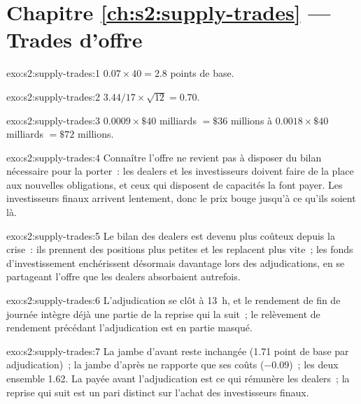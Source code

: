 \section*{Chapitre \ref{ch:s2:supply-trades} --- Trades d'offre}

\begin{solution}{exo:s2:supply-trades:1}
$0.07 \times 40 = 2.8$ points de base.
\end{solution}

\begin{solution}{exo:s2:supply-trades:2}
$3.44/17 \times \sqrt{12} = 0.70$.
\end{solution}

\begin{solution}{exo:s2:supply-trades:3}
$0.0009 \times \$40$ milliards $= \$36$ millions à $0.0018 \times \$40$ milliards $= \$72$ millions.
\end{solution}

\begin{solution}{exo:s2:supply-trades:4}
Connaître l'offre ne revient pas à disposer du bilan nécessaire pour la porter~: les dealers et les investisseurs doivent faire de la place aux nouvelles obligations, et ceux qui
disposent de capacités la font payer. Les investisseurs finaux arrivent lentement, donc le prix bouge jusqu'à ce qu'ils soient là.
\end{solution}

\begin{solution}{exo:s2:supply-trades:5}
Le bilan des dealers est devenu plus coûteux depuis la crise~: ils prennent des positions plus petites et les replacent plus vite~; les fonds d'investissement enchérissent désormais davantage lors des
adjudications, en se partageant l'offre que les dealers absorbaient autrefois.
\end{solution}

\begin{solution}{exo:s2:supply-trades:6}
L'adjudication se clôt à 13~h, et le rendement de fin de journée intègre déjà une partie de la reprise qui la suit~; le
relèvement de rendement précédant l'adjudication est en partie masqué.
\end{solution}

\begin{solution}{exo:s2:supply-trades:7}
La jambe d'avant reste inchangée (1.71 point de base par adjudication)~; la jambe d'après ne rapporte que ses coûts ($-0.09$)~; les deux ensemble 1.62. La 
payée avant l'adjudication est ce qui rémunère les dealers~; la reprise qui suit est un pari distinct sur l'achat des investisseurs finaux.
\end{solution}

